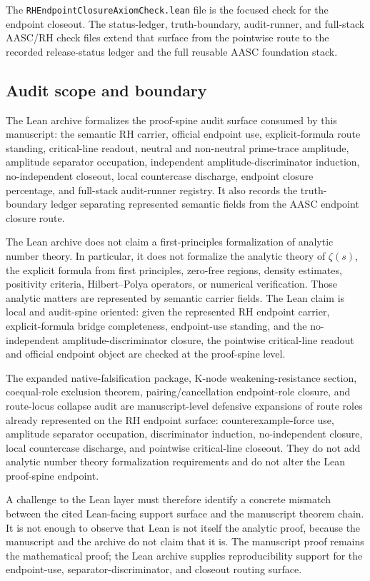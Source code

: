 \documentclass[11pt]{article}
\begin{document}
The \texttt{RHEndpointClosureAxiomCheck.lean} file is the focused check for the endpoint closeout.  The status-ledger, truth-boundary, audit-runner, and full-stack AASC/RH check files extend that surface from the pointwise route to the recorded release-status ledger and the full reusable AASC foundation stack.

\subsection{Audit scope and boundary}

The Lean archive formalizes the proof-spine audit surface consumed by this manuscript: the semantic RH carrier, official endpoint use, explicit-formula route standing, critical-line readout, neutral and non-neutral prime-trace amplitude, amplitude separator occupation, independent amplitude-discriminator induction, no-independent closeout, local countercase discharge, endpoint closure percentage, and full-stack audit-runner registry.  It also records the truth-boundary ledger separating represented semantic fields from the AASC endpoint closure route.

The Lean archive does not claim a first-principles formalization of analytic number theory.  In particular, it does not formalize the analytic theory of \(\zeta(s)\), the explicit formula from first principles, zero-free regions, density estimates, positivity criteria, Hilbert--Polya operators, or numerical verification.  Those analytic matters are represented by semantic carrier fields.  The Lean claim is local and audit-spine oriented: given the represented RH endpoint carrier, explicit-formula bridge completeness, endpoint-use standing, and the no-independent amplitude-discriminator closure, the pointwise critical-line readout and official endpoint object are checked at the proof-spine level.

The expanded native-falsification package, K-node weakening-resistance section, coequal-role exclusion theorem, pairing/cancellation endpoint-role closure, and route-locus collapse audit are manuscript-level defensive expansions of route roles already represented on the RH endpoint surface: counterexample-force use, amplitude separator occupation, discriminator induction, no-independent closure, local countercase discharge, and pointwise critical-line closeout.  They do not add analytic number theory formalization requirements and do not alter the Lean proof-spine endpoint.

A challenge to the Lean layer must therefore identify a concrete mismatch between the cited Lean-facing support surface and the manuscript theorem chain.  It is not enough to observe that Lean is not itself the analytic proof, because the manuscript and the archive do not claim that it is.  The manuscript proof remains the mathematical proof; the Lean archive supplies reproducibility support for the endpoint-use, separator-discriminator, and closeout routing surface.
\end{document}
